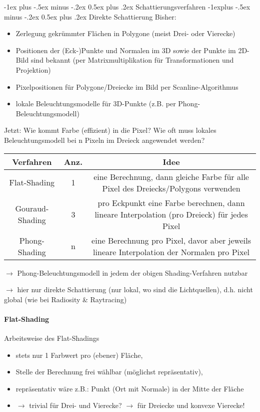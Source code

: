 \documentclass[10pt,landscape]{article}
\makeatletter
\renewcommand{\section}{\@startsection{section}{1}{0mm}%
                                {-1ex plus -.5ex minus -.2ex}%
                                {0.5ex plus .2ex}%
                                {\normalfont\large\bfseries}}
\renewcommand{\subsection}{\@startsection{subsection}{2}{0mm}%
                                {-1explus -.5ex minus -.2ex}%
                                {0.5ex plus .2ex}%
                                {\normalfont\normalsize\bfseries}}
\makeatother
\begin{document}
\begin{multicols}{3}
\section{Schattierungsverfahren}
\subsection{ Direkte Schattierung}
Bisher:
\begin{itemize}
  \item Zerlegung gekrümmter Flächen in Polygone (meist Drei- oder Vierecke)
  \item Positionen der (Eck-)Punkte und Normalen im 3D sowie der Punkte im 2D-Bild sind bekannt (per Matrixmultiplikation für Transformationen und Projektion)
  \item Pixelpositionen für Polygone/Dreiecke im Bild per Scanline-Algorithmus
  \item lokale Beleuchtungsmodelle für 3D-Punkte (z.B. per Phong-Beleuchtungsmodell)
\end{itemize}

Jetzt: Wie kommt Farbe (effizient) in die Pixel? Wie oft muss lokales Beleuchtungsmodell bei n Pixeln im Dreieck angewendet werden?

\begin{tabular}{c | c | c}
  Verfahren       & Anz. & Idee                                                                                        \\\hline
  Flat-Shading    & 1    & eine Berechnung, dann gleiche Farbe für alle Pixel des Dreiecks/Polygons verwenden          \\
  Gouraud-Shading & 3    & pro Eckpunkt eine Farbe berechnen, dann lineare Interpolation (pro Dreieck) für jedes Pixel \\
  Phong-Shading   & n    & eine Berechnung pro Pixel, davor aber jeweils lineare Interpolation der Normalen pro Pixel  \\
\end{tabular}

$\rightarrow$ Phong-Beleuchtungsmodell in jedem der obigen Shading-Verfahren nutzbar

$\rightarrow$ hier nur direkte Schattierung (nur lokal, wo sind die Lichtquellen), d.h. nicht global (wie bei Radiosity \& Raytracing)

\paragraph{Flat-Shading}
Arbeitsweise des Flat-Shadings
\begin{itemize}
  \item stets nur 1 Farbwert pro (ebener) Fläche,
  \item Stelle der Berechnung frei wählbar (möglichst repräsentativ),
  \item repräsentativ wäre z.B.: Punkt (Ort mit Normale) in der Mitte der Fläche
  \item $\rightarrow$ trivial für Drei- und Vierecke? $\rightarrow$ für Dreiecke und konvexe Vierecke!
\end{itemize}


\end{multicols}
\end{document}
